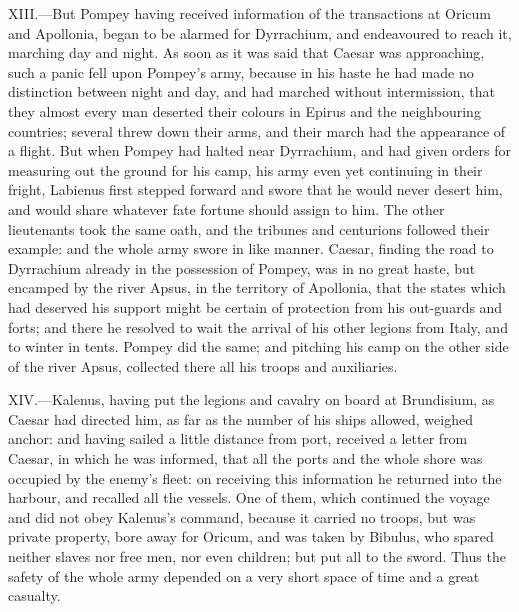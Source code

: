 XIII.—But Pompey having received information of the transactions at
Oricum and Apollonia, began to be alarmed for Dyrrachium, and
endeavoured to reach it, marching day and night. As soon as it was said
that Caesar was approaching, such a panic fell upon Pompey's army,
because in his haste he had made no distinction between night and day,
and had marched without intermission, that they almost every man
deserted their colours in Epirus and the neighbouring countries; several
threw down their arms, and their march had the appearance of a flight.
But when Pompey had halted near Dyrrachium, and had given orders for
measuring out the ground for his camp, his army even yet continuing in
their fright, Labienus first stepped forward and swore that he would
never desert him, and would share whatever fate fortune should assign to
him. The other lieutenants took the same oath, and the tribunes and
centurions followed their example: and the whole army swore in like
manner. Caesar, finding the road to Dyrrachium already in the possession
of Pompey, was in no great haste, but encamped by the river Apsus, in
the territory of Apollonia, that the states which had deserved his
support might be certain of protection from his out-guards and forts;
and there he resolved to wait the arrival of his other legions from
Italy, and to winter in tents. Pompey did the same; and pitching his
camp on the other side of the river Apsus, collected there all his
troops and auxiliaries.

XIV.—Kalenus, having put the legions and cavalry on board at
Brundisium, as Caesar had directed him, as far as the number of his
ships allowed, weighed anchor: and having sailed a little distance from
port, received a letter from Caesar, in which he was informed, that all
the ports and the whole shore was occupied by the enemy's fleet: on
receiving this information he returned into the harbour, and recalled
all the vessels. One of them, which continued the voyage and did not
obey Kalenus's command, because it carried no troops, but was private
property, bore away for Oricum, and was taken by Bibulus, who spared
neither slaves nor free men, nor even children; but put all to the
sword. Thus the safety of the whole army depended on a very short space
of time and a great casualty.

